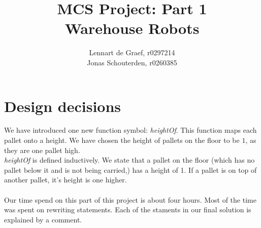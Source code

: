 \documentclass[10pt,a4paper]{article}
\begin{document}
\author{Lennart de Graef, r0297214\\Jonas Schouterden, r0260385}
\title{MCS Project: Part 1 \\
Warehouse Robots}
\maketitle

\section*{Design decisions}
We have introduced one new function symbol: \emph{heightOf}. This function maps each pallet onto a height. We have chosen the height of pallets on the floor to be $1$, as they are one pallet high.
\\
\emph{heightOf} is defined inductively. We state that a pallet on the floor (which has no pallet below it and is not being carried,) has a height of 1.
If a pallet is on top of another pallet, it's height is one higher.\\
\\
Our time spend on this part of this project is about four hours. Most of the time was spent on rewriting statements. Each of the staments in our final solution is explained by a comment. 
\end{document}
